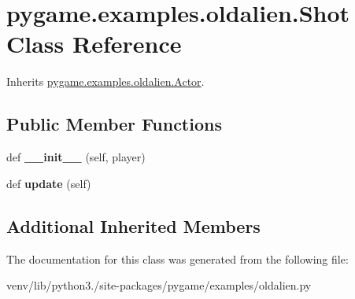 \hypertarget{classpygame_1_1examples_1_1oldalien_1_1_shot}{}\section{pygame.\+examples.\+oldalien.\+Shot Class Reference}
\label{classpygame_1_1examples_1_1oldalien_1_1_shot}


Inherits \hyperlink{classpygame_1_1examples_1_1oldalien_1_1_actor}{pygame.\+examples.\+oldalien.\+Actor}.

\subsection*{Public Member Functions}
\begin{DoxyCompactItemize}
\item 
\mbox{\label{classpygame_1_1examples_1_1oldalien_1_1_shot_aaf0e2a85fac6acaef17cb49425383bda}} 
def {\bfseries \+\_\+\+\_\+init\+\_\+\+\_\+} (self, player)
\item 
\mbox{\label{classpygame_1_1examples_1_1oldalien_1_1_shot_adf292839db734fdcdb2018e5c76b6198}} 
def {\bfseries update} (self)
\end{DoxyCompactItemize}
\subsection*{Additional Inherited Members}


The documentation for this class was generated from the following file\+:\begin{DoxyCompactItemize}
\item 
venv/lib/python3./site-\/packages/pygame/examples/oldalien.\+py\end{DoxyCompactItemize}
